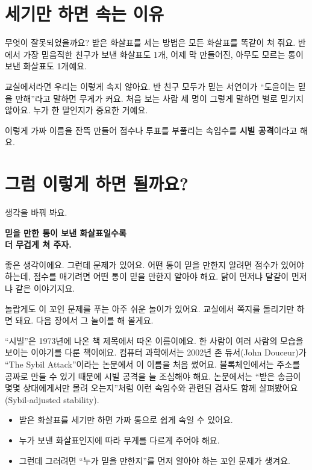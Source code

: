 \section{세기만 하면 속는 이유}

무엇이 잘못되었을까요?
받은 화살표를 세는 방법은 모든 화살표를 똑같이 쳐 줘요.
반에서 가장 믿음직한 친구가 보낸 화살표도 1개,
어제 막 만들어진, 아무도 모르는 통이 보낸 화살표도 1개예요.

교실에서라면 우리는 이렇게 속지 않아요.
반 친구 모두가 믿는 서연이가 “도윤이는 믿을 만해”라고 말하면 무게가 커요.
처음 보는 사람 세 명이 그렇게 말하면 별로 믿기지 않아요.
누가 한 말인지가 중요한 거예요.

이렇게 가짜 이름을 잔뜩 만들어 점수나 투표를 부풀리는 속임수를 \textbf{시빌 공격}이라고 해요.

\section{그럼 이렇게 하면 될까요?}

생각을 바꿔 봐요.

\begin{center}
\begin{tcolorbox}[colback=white, colframe=inkblue, boxrule=0.8pt, arc=2mm, width=0.9\linewidth, halign=center]
\titlefont\bfseries 믿을 만한 통이 보낸 화살표일수록\\더 무겁게 쳐 주자.
\end{tcolorbox}
\end{center}

좋은 생각이에요.
그런데 문제가 있어요.
어떤 통이 믿을 만한지 알려면 점수가 있어야 하는데,
점수를 매기려면 어떤 통이 믿을 만한지 알아야 해요.
닭이 먼저냐 달걀이 먼저냐 같은 이야기지요.

놀랍게도 이 꼬인 문제를 푸는 아주 쉬운 놀이가 있어요.
교실에서 쪽지를 돌리기만 하면 돼요.
다음 장에서 그 놀이를 해 볼게요.

\begin{deeper}[시빌이라는 이름]
“시빌”은 1973년에 나온 책 제목에서 따온 이름이에요.
한 사람이 여러 사람의 모습을 보이는 이야기를 다룬 책이에요.
컴퓨터 과학에서는 2002년 존 듀서(John Douceur)가 “The Sybil Attack”이라는 논문에서 이 이름을 처음 썼어요.
블록체인에서는 주소를 공짜로 만들 수 있기 때문에 시빌 공격을 늘 조심해야 해요.
논문에서는 “받은 송금이 몇몇 상대에게서만 몰려 오는지”처럼 이런 속임수와 관련된 검사도 함께 살펴봤어요(Sybil-adjusted stability).
\end{deeper}

\begin{learned}
\begin{itemize}
\item 받은 화살표를 세기만 하면 가짜 통으로 쉽게 속일 수 있어요.
\item 누가 보낸 화살표인지에 따라 무게를 다르게 주어야 해요.
\item 그런데 그러려면 “누가 믿을 만한지”를 먼저 알아야 하는 꼬인 문제가 생겨요.
\end{itemize}
\end{learned}
